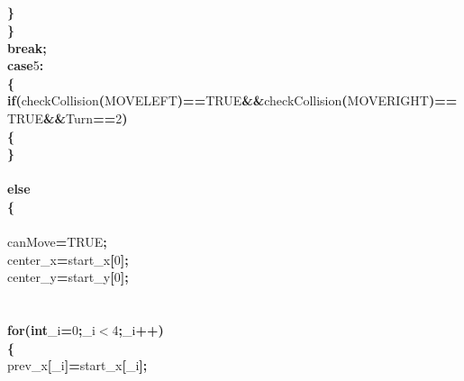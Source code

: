 \documentclass[a4paper, 10pt]{article}
\newcommand\SPC{\hspace*{0.6em}}
\newcommand{\CppAIdentifier}[1]{#1}
\newcommand{\CppANumber}[1]{\textcolor[rgb]{0.5,0,0.5}{#1}}
\newcommand{\CppAReservedWord}[1]{\textbf{#1}}
\newcommand{\CppASpace}[1]{\colorbox[rgb]{1,1,1}{#1}}
\newcommand{\CppASymbol}[1]{\textbf{\textcolor[rgb]{1,0,0}{#1}}}
\begin{document}
\begin{ttfamily}
\\
\\
\\
\\
\CppASpace{\SPC \SPC \SPC }\CppASymbol{\}}\\
\CppASpace{\SPC \SPC }\CppASymbol{\}}\\
\CppASpace{\SPC \SPC }\CppAReservedWord{break}\CppASymbol{;}\\
\CppASpace{\SPC \SPC }\CppAReservedWord{case}\CppASpace{\SPC }\CppANumber{5}\CppASymbol{:}\\
\CppASpace{\SPC \SPC }\CppASymbol{\{}\\
\CppASpace{\SPC \SPC \SPC }\CppAReservedWord{if}\CppASymbol{(}\CppAIdentifier{checkCollision}\CppASymbol{(}\CppAIdentifier{MOVELEFT}\CppASymbol{)}\CppASymbol{==}\CppAIdentifier{TRUE}\CppASymbol{\&\&}\CppAIdentifier{checkCollision}\CppASymbol{(}\CppAIdentifier{MOVERIGHT}\CppASymbol{)}\CppASymbol{==}\CppAIdentifier{TRUE}\CppASymbol{\&\&}\CppAIdentifier{Turn}\CppASymbol{==}\CppANumber{2}\CppASymbol{)}\\
\CppASpace{\SPC \SPC \SPC }\CppASymbol{\{}\\
\CppASpace{\SPC \SPC \SPC }\CppASymbol{\}}\\
\\
\CppASpace{\SPC \SPC \SPC }\CppAReservedWord{else}\\
\CppASpace{\SPC \SPC \SPC }\CppASymbol{\{}\\
\\
\CppASpace{\SPC \SPC \SPC \SPC }\CppAIdentifier{canMove}\CppASymbol{=}\CppAIdentifier{TRUE}\CppASymbol{;}\\
\CppASpace{\SPC \SPC \SPC \SPC }\CppAIdentifier{center\_x}\CppASymbol{=}\CppAIdentifier{start\_x}\CppASymbol{[}\CppANumber{0}\CppASymbol{]}\CppASymbol{;}\\
\CppASpace{\SPC \SPC \SPC \SPC }\CppAIdentifier{center\_y}\CppASymbol{=}\CppAIdentifier{start\_y}\CppASymbol{[}\CppANumber{0}\CppASymbol{]}\CppASymbol{;}\\
\\
\\
\CppASpace{\SPC \SPC \SPC \SPC }\CppAReservedWord{for}\CppASymbol{(}\CppAReservedWord{int}\CppASpace{\SPC }\CppAIdentifier{\_i}\CppASymbol{=}\CppANumber{0}\CppASymbol{;}\CppAIdentifier{\_i}\CppASymbol{$<$}\CppANumber{4}\CppASymbol{;}\CppAIdentifier{\_i}\CppASymbol{++}\CppASymbol{)}\\
\CppASpace{\SPC \SPC \SPC \SPC }\CppASymbol{\{}\\
\CppASpace{\SPC \SPC \SPC \SPC \SPC }\CppAIdentifier{prev\_x}\CppASymbol{[}\CppAIdentifier{\_i}\CppASymbol{]}\CppASymbol{=}\CppAIdentifier{start\_x}\CppASymbol{[}\CppAIdentifier{\_i}\CppASymbol{]}\CppASymbol{;}\\

\end{ttfamily}
\end{document}
